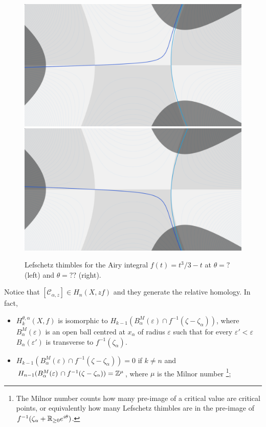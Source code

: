 \documentclass[11pt,a4paper,twoside,leqno,noamsfonts]{amsart}
\numberwithin{equation}{section}
\begin{document}
\begin{figure}[h]
\includegraphics[scale=0.075]{veer-left_matching}
\includegraphics[scale=0.075]{veer-right_matching}
\caption{Lefschetz thimbles for the Airy integral $f(t)=t^3/3-t$ at $\theta=?$ (left) and $\theta=??$ (right). }\label{Lefschetz_thimbles}
\end{figure}

Notice that $[\mathcal{C}_{\alpha,z}]\in H_n(X,zf)$ and they generate the relative homology. In fact,  

\begin{itemize}
\item $H_k^{\theta,\alpha}(X,f)$ is isomorphic to $H_{k-1}(B_\alpha^M(\varepsilon)\cap f^{-1}(\zeta-\zeta_\alpha))$, where $B_\alpha
^M(\varepsilon)$ is an open ball centred at $x_\alpha$ of radius $\varepsilon$ such that for every $\varepsilon'<\varepsilon$ $B_\alpha(\varepsilon')$ is transverse to $f^{-1}(\zeta_\alpha)$. 
\item $H_{k-1}(B_\alpha^M(\varepsilon)\cap f^{-1}(\zeta-\zeta_\alpha))=0$ if $k\neq n$ and $H_{n-1}(B_\alpha^M(\varepsilon)\,\cap f^{-1}(\zeta-\zeta_\alpha))=\mathbb Z^\mu$, where $\mu$ is the Milnor number \footnote{The Milnor number counts how many pre-image of a critical value are critical points, or equivalently how many Lefschetz thimbles are in the pre-image of $f^{-1}(\zeta_\alpha+\mathbb R_{\geq 0}e^{i\theta})$.};   
\end{itemize}
\end{document}
